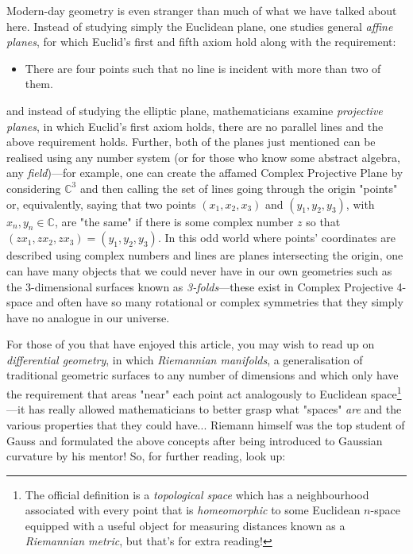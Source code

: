 \begin{multicols}{2}

Modern-day geometry is even stranger than much of what we have talked about here. Instead of studying simply the Euclidean plane, one studies general \textit{affine planes}, for which Euclid's first and fifth axiom hold along with the requirement:

\begin{itemize}
\item There are four points such that no line is incident with more than two of them.
\end{itemize}

and instead of studying the elliptic plane, mathematicians examine \textit{projective planes}, in which Euclid's first axiom holds, there are no parallel lines and the above requirement holds. Further, both of the planes just mentioned can be realised using any number system (or for those who know some abstract algebra, any \textit{field})---for example, one can create the affamed Complex Projective Plane by considering \(\mathbb{C}^3\) and then calling the set of lines going through the origin "points" or, equivalently, saying that two points \((x_1,x_2,x_3)\) and \((y_1,y_2,y_3)\), with \(x_n,y_n \in \mathbb{C}\), are "the same" if there is some complex number \(z\) so that \((zx_1,zx_2,zx_3) = (y_1,y_2,y_3)\). In this odd world where points' coordinates are described using complex numbers and lines are planes intersecting the origin, one can have many objects that we could never have in our own geometries such as the 3-dimensional surfaces known as \textit{3-folds}---these exist in Complex Projective 4-space and often have so many rotational or complex symmetries that they simply have no analogue in our universe.

For those of you that have enjoyed this article, you may wish to read up on \textit{differential geometry}, in which \textit{Riemannian manifolds}, a generalisation of traditional geometric surfaces to any number of dimensions and which only have the requirement that areas "near" each point act analogously to Euclidean space\footnote{The official definition is a \textit{topological space} which has a neighbourhood associated with every point that is \textit{homeomorphic} to some Euclidean \(n\)-space equipped with a useful object for measuring distances known as a \textit{Riemannian metric}, but that's for extra reading!}---it has really allowed mathematicians to better grasp what "spaces" \textit{are} and the various properties that they could have... Riemann himself was the top student of Gauss and formulated the above concepts after being introduced to Gaussian curvature by his mentor! So, for further reading, look up:


\end{multicols}
